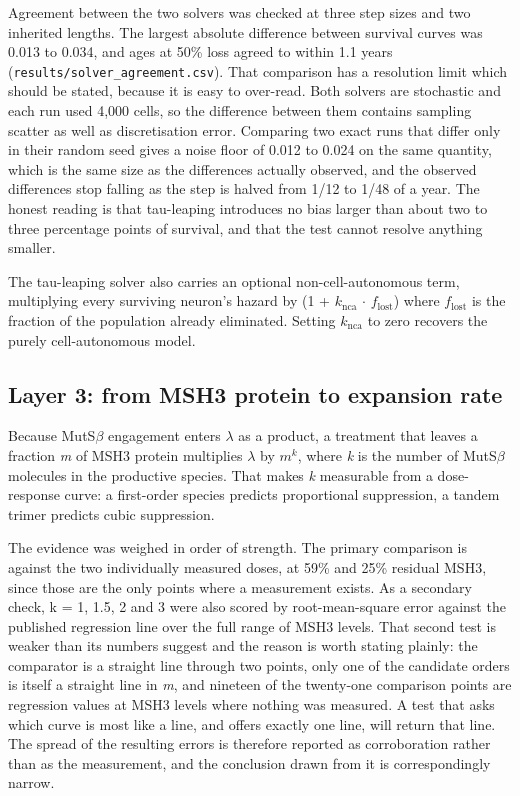 \documentclass[conference]{IEEEtran}
\begin{document}
Agreement between the two solvers was checked at three step sizes and two inherited lengths. The largest absolute difference between survival curves was 0.013 to 0.034, and ages at 50\% loss agreed to within 1.1 years (\texttt{results/\allowbreak{}solver\_\allowbreak{}agreement.\allowbreak{}csv}). That comparison has a resolution limit which should be stated, because it is easy to over-read. Both solvers are stochastic and each run used 4,000 cells, so the difference between them contains sampling scatter as well as discretisation error. Comparing two exact runs that differ only in their random seed gives a noise floor of 0.012 to 0.024 on the same quantity, which is the same size as the differences actually observed, and the observed differences stop falling as the step is halved from 1/12 to 1/48 of a year. The honest reading is that tau-leaping introduces no bias larger than about two to three percentage points of survival, and that the test cannot resolve anything smaller.

The tau-leaping solver also carries an optional non-cell-autonomous term, multiplying every surviving neuron's hazard by (1 + $k_{\mathrm{nca}}$ $\cdot$ $f_{\mathrm{lost}}$) where $f_{\mathrm{lost}}$ is the fraction of the population already eliminated. Setting $k_{\mathrm{nca}}$ to zero recovers the purely cell-autonomous model.

\subsection{Layer 3: from MSH3 protein to expansion rate}
\label{sec:2.6}
Because MutS$\beta$ engagement enters $\lambda$ as a product, a treatment that leaves a fraction \textit{m} of MSH3 protein multiplies $\lambda$ by \textit{$m^{k}$}, where \textit{k} is the number of MutS$\beta$ molecules in the productive species. That makes \textit{k} measurable from a dose-response curve: a first-order species predicts proportional suppression, a tandem trimer predicts cubic suppression.

The evidence was weighed in order of strength. The primary comparison is against the two individually measured doses, at 59\% and 25\% residual MSH3, since those are the only points where a measurement exists. As a secondary check, k = 1, 1.5, 2 and 3 were also scored by root-mean-square error against the published regression line \cite{disirna} over the full range of MSH3 levels. That second test is weaker than its numbers suggest and the reason is worth stating plainly: the comparator is a straight line through two points, only one of the candidate orders is itself a straight line in \textit{m}, and nineteen of the twenty-one comparison points are regression values at MSH3 levels where nothing was measured. A test that asks which curve is most like a line, and offers exactly one line, will return that line. The spread of the resulting errors is therefore reported as corroboration rather than as the measurement, and the conclusion drawn from it is correspondingly narrow.
\end{document}
